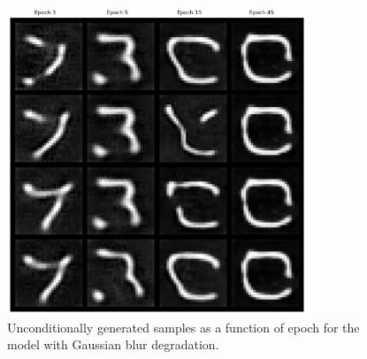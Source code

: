 \documentclass[11pt]{article}
\begin{document}
\begin{figure}[H]
    \centering
    \includegraphics[width=0.8\textwidth]{figs/q2b_blur_uncond_samples.png}
    \caption{Unconditionally generated samples as a function of epoch for the model with Gaussian blur degradation.}
    \label{fig:q2b_unconditional_samples}
\end{figure}
\end{document}
